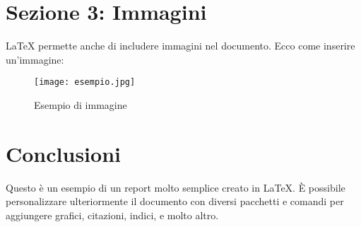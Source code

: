 \documentclass[12pt]{article} %
\begin{document}
\section{Sezione 3: Immagini}
LaTeX permette anche di includere immagini nel documento. Ecco come inserire un'immagine:

\begin{figure}[h]
\centering
\texttt{[image: esempio.jpg]}  %
\caption{Esempio di immagine}
\end{figure}

\section{Conclusioni}
Questo è un esempio di un report molto semplice creato in LaTeX. È possibile personalizzare ulteriormente il documento con diversi pacchetti e comandi per aggiungere grafici, citazioni, indici, e molto altro.
\end{document}
